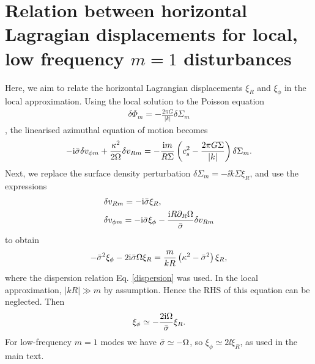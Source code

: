 \section{Relation between horizontal Lagragian displacements for
  local, low frequency \lowercase{$m=1$} disturbances}\label{horizontal_displacements}
Here, we aim to relate the horizontal Lagrangian displacements $\xi_R$
and $\xi_\phi$ in the local approximation. Using the local solution to
the Poisson equation 
\begin{align}
  \delta \Phi_m = -\frac{2\pi G}{|k|} \delta\Sigma_m 
\end{align}
\citep{shu91}, the linearised azimuthal equation of motion becomes 
\begin{align} 
  - \mathrm{i}\bar{\sigma} \delta v_{\phi m}  + \frac{\kappa^2}{2\Omega}\delta v_{Rm} = -\frac{\mathrm{i}
    m}{R\Sigma}\left(c_s^2 - \frac{2\pi G
      \Sigma}{|k|}\right)\delta\Sigma_m. 
\end{align}
Next, we replace the surface density perturbation
$\delta \Sigma_m = -\ii k \Sigma \xi_R$, and use the expressions
\begin{align}
  &\delta v_{Rm} = -\mathrm{i}\bar{\sigma}\xi_R,\\
  &\delta v_{\phi m} = -\mathrm{i}\bar{\sigma}\xi_\phi - \frac{\mathrm{i} R
    \partial_R\Omega}{\bar{\sigma}} \delta v_{Rm}
\end{align}
\citep{papaloizou85} to obtain 
\begin{align}
  -\bar{\sigma}^2\xi_\phi - 2\mathrm{i}\bar{\sigma}\Omega \xi_R =
  \frac{m}{kR}\left(\kappa^2 - \bar{\sigma}^2\right)\xi_R, 
\end{align}
where the dispersion relation Eq. \ref{dispersion} was used. 
In the local approximation, $|kR|\gg m$ by assumption.%
 Hence the RHS of this equation can be neglected. Then 
\begin{align}
  \xi_\phi \simeq -\frac{2\mathrm{i}\Omega}{\bar{\sigma}}\xi_R.
\end{align}
For low-frequency $m=1$ modes we have $\bar{\sigma} \simeq -\Omega$, so
$\xi_\phi\simeq 2\ii\xi_R$, as used in the main text.  